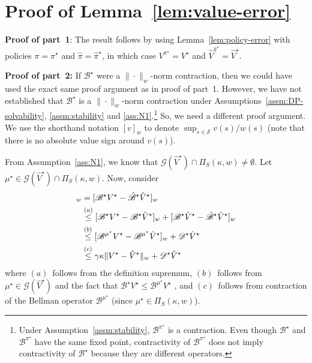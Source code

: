 \documentclass[letterpaper, 10pt]{IEEEtran}
\newcommand*\ALPHABET{\mathcal}
\newcommand*\BELLMAN{\mathscr{B}}
\newcommand*\MISMATCH{\mathscr{D}}
\newcommand*\tuple{\kappa, w}
\begin{document}
\section{Proof of Lemma~\ref{lem:value-error}}\label{app:value-error}
\textbf{Proof of part~1}: The result follows by using Lemma~\ref{lem:policy-error} with policies $\pi = \pi^\star$ and $\hat \pi = \hat \pi^\star$, in which case $V^{\pi^\star} = V^\star$ and $\hat V^{\hat \pi^\star} = \hat V^\star$.

\textbf{Proof of part~2:} If $\BELLMAN^\star$ were a $\|\cdot\|_w$-norm contraction, then we could have used the exact same proof argument as  in proof of part~1. However, we have not established that $\BELLMAN^\star$ is a $\|\cdot\|_w$-norm contraction under Assumptions~\ref{assm:DP-solvability}, \ref{assm:stability} and \ref{ass:N1}.\footnote{Under Assumption~\ref{assm:stability}, $\BELLMAN^{\pi^\star}$ is a contraction.
Even though $\BELLMAN^\star$ and $\BELLMAN^{\pi^\star}$ have the same fixed point,
contractivity of $\BELLMAN^{\pi^\star}$ does not imply contractivity of $\BELLMAN^\star$
because they are different operators.}
So, we need a different proof argument.
We use the shorthand notation $[ v ]_{w}$ to denote $\sup_{s \in \ALPHABET S} v(s)/w(s)$ (note that there is no absolute value sign around $v(s)$). 

From Assumption~\ref{ass:N1}, we know that $\ALPHABET G(\hat V^\star) \cap \Pi_S(\tuple) \neq \emptyset$. Let $\mu^\star \in \ALPHABET G(\hat V^\star) \cap  \Pi_S(\tuple)$. Now, consider
\begin{align}
    [ V^\star - \hat V^\star ]_{w} 
    &=
    [ \BELLMAN^{\star} V^{\star} - \hat {\BELLMAN}^{\star} \hat V^{\star}]_{w}
    \notag \\
    &\stackrel{(a)}\le
    [ \BELLMAN^{\star} V^{\star} - \BELLMAN^{\star} \hat V^{\star}]_{w}
    +
    [ \BELLMAN^{\star} \hat V^{\star} - \hat {\BELLMAN}^{\star} \hat V^{\star}]_{w}
    \notag \\
    &\stackrel{(b)}\le 
    [ \BELLMAN^{\mu^\star} V^{\star} - \BELLMAN^{\mu^\star} \hat V^{\star}]_{w}
    + 
    \MISMATCH^{\star} \hat V^\star
    \notag \\
    &\stackrel{(c)}\le \gamma\kappa \| V^{\star} - \hat V^{\star} \|_w 
    + 
    \MISMATCH^{\star} \hat V^\star \label{eq:alt-proof-1}
\end{align}
where $(a)$~follows from the definition supremum, $(b)$~follows   from  $\mu^\star \in \ALPHABET G(\hat V^\star)$  and the fact that $\BELLMAN^\star  V^\star \le \BELLMAN^{\mu^\star} V^\star$ , and $(c)$~follows from contraction of the Bellman operator $\BELLMAN^{\mu^\star}$ (since $\mu^\star \in \Pi_S(\tuple)$). 
\end{document}
